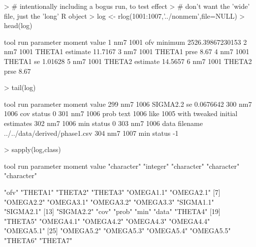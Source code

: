 \begin{Schunk}
\begin{Sinput}
> # intentionally including a bogus run, to test effect
> # don't want the 'wide' file, just the 'long' R object
> log <- rlog(1001:1007,'../nonmem',file=NULL) 
> head(log)
\end{Sinput}
\begin{Soutput}
  tool  run parameter   moment            value
1  nm7 1001       ofv  minimum 2526.39867230153
2  nm7 1001    THETA1 estimate          11.7167
3  nm7 1001    THETA1     prse             8.67
4  nm7 1001    THETA1       se          1.01628
5  nm7 1001    THETA2 estimate          14.5657
6  nm7 1001    THETA2     prse             8.67
\end{Soutput}
\begin{Sinput}
> tail(log)
\end{Sinput}
\begin{Soutput}
    tool  run parameter   moment                                         value
299  nm7 1006  SIGMA2.2       se                                     0.0676642
300  nm7 1006       cov   status                                             0
301  nm7 1006      prob     text 1006 like 1005 with tweaked initial estimates
302  nm7 1006       min   status                                             0
303  nm7 1006      data filename                 ../../data/derived/phase1.csv
304  nm7 1007       min   status                                            -1
\end{Soutput}
\begin{Sinput}
> sapply(log,class)
\end{Sinput}
\begin{Soutput}
       tool         run   parameter      moment       value 
"character"   "integer" "character" "character" "character" 
\end{Soutput}
\begin{Soutput}
 [1] "ofv"      "THETA1"   "THETA2"   "THETA3"   "OMEGA1.1" "OMEGA2.1"
 [7] "OMEGA2.2" "OMEGA3.1" "OMEGA3.2" "OMEGA3.3" "SIGMA1.1" "SIGMA2.1"
[13] "SIGMA2.2" "cov"      "prob"     "min"      "data"     "THETA4"  
[19] "THETA5"   "OMEGA4.1" "OMEGA4.2" "OMEGA4.3" "OMEGA4.4" "OMEGA5.1"
[25] "OMEGA5.2" "OMEGA5.3" "OMEGA5.4" "OMEGA5.5" "THETA6"   "THETA7"  
\end{Soutput}
\begin{Sinput}

\end{Sinput}
\end{Schunk}

